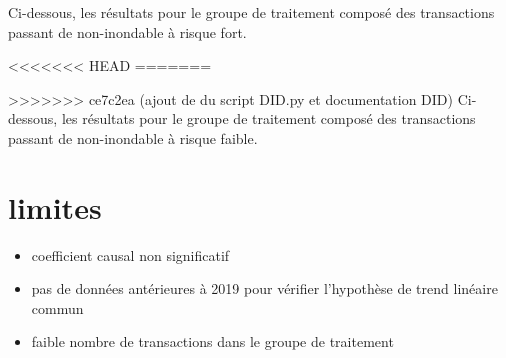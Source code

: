 \documentclass[a4paper,12pt]{article}
\begin{document}
Ci-dessous, les résultats pour le groupe de traitement composé des transactions passant de non-inondable à risque fort. \newline


<<<<<<< HEAD
\newline
=======

>>>>>>> ce7c2ea (ajout de du script DID.py et documentation DID)
Ci-dessous, les résultats pour le groupe de traitement composé des transactions passant de non-inondable à risque faible. \newline




\section{limites}
\begin{itemize}
\item coefficient causal non significatif
\item pas de données antérieures à 2019 pour vérifier l'hypothèse de trend linéaire commun
\item faible nombre de transactions dans le groupe de traitement
\end{itemize}
\end{document}
